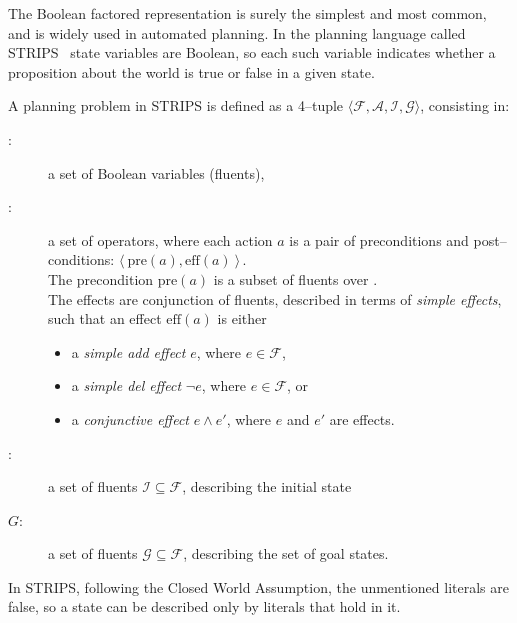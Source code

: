 The Boolean factored representation is surely the simplest and most
common, and is widely used in automated planning.  In the planning language called STRIPS~\citep{fikes:strips,
  nilsson:ai} state variables are Boolean, so each such variable
indicates whether a proposition about the world is true or false in a
given state.
 

\begin{definition}[STRIPS]\label{def:strips}
  A planning problem in STRIPS is defined as a 4--tuple $\langle \mathcal{F, A, I, G} \rangle$, 
consisting in:
  \begin{description}
  \item[\fluents:] a set of Boolean variables (fluents), 
  \item[\acts:] a set of operators, where each action $a$ is  a pair of
    pre\-conditions  and post--conditions: 
     $\langle\: \text{pre}(a), \text{eff}(a)\:\rangle\,$.\\
%
The precondition pre$(a)$ is a subset of fluents over \fluents.\\
%
The effects are conjunction of fluents, described in terms of \emph{simple effects},
such that 
an effect  $\text{eff}(a)$ is either
\begin{itemize}
\item a \emph{simple add effect} $e$, where $e \in \mathcal{F}$,
\item a \emph{simple del effect} $\neg e$, where $e \in \mathcal{F}$, or
\item a \emph{conjunctive effect} $e \land e'$, where $e$ and $e'$ are effects.
\end{itemize}
  \item[\init:] a set of fluents $\mathcal{I} \subseteq \mathcal{F}$, describing the initial state
  \item[$G$:] a set of fluents $\mathcal{G} \subseteq \mathcal{F}$, describing the set of goal states.
  \end{description}


In STRIPS, following the Closed World Assumption, the unmentioned literals are false, so a state can be described only by literals that hold in it.
\end{definition}

